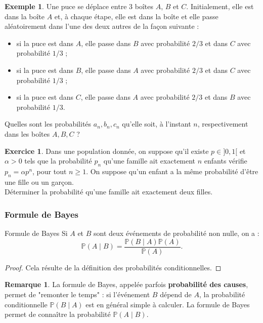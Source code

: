 \documentclass[french]{article}
\renewcommand{\P}{\mathbb{P}}
\theoremstyle{plain}
\theoremstyle{definition}
\newtheorem*{ex}{Exemple}
\newtheorem{exo}{Exercice}
\newtheorem*{rmq}{Remarque}
\theoremstyle{remark}
\begin{document}
\begin{ex}
	Une puce se déplace entre $3$ boîtes $A$, $B$ et $C$. Initialement, elle est dans la boîte $A$ et, à chaque étape, elle est dans la boîte et elle passe aléatoirement dans l'une des deux autres de la façon suivante :
	\begin{itemize}
		\item si la puce est dans $A$, elle passe dans $B$ avec probabilité $2/3$ et dans $C$ avec probabilité $1/3$ ;
		\item si la puce est dans $B$, elle passe dans $A$ avec probabilité $2/3$ et dans $C$ avec probabilité $1/3$ ;
		\item si la puce est dans $C$, elle passe dans $A$ avec probabilité $2/3$ et dans $B$ avec probabilité $1/3$.
	\end{itemize}
	Quelles sont les probabilités $a_n,b_n,c_n$ qu'elle soit, à l'instant $n$, respectivement dans les boîtes $A,B,C$ ?
\end{ex}

\begin{exo}
	Dans une population donnée, on suppose qu'il existe $p\in]0,1[$ et $\alpha>0$ tels que la probabilité $p_n$ qu'une famille ait exactement $n$ enfants vérifie $p_n=\alpha p^n$, pour tout $n\geqslant 1$. On suppose qu'un enfant a la même probabilité d'être une fille ou un garçon.\\
	Déterminer la probabilité qu'une famille ait exactement deux filles.
\end{exo}

\subsubsection*{Formule de Bayes}

\begin{thm}{Formule de Bayes}%
	Si $A$ et $B$ sont deux événements de probabilité non nulle, on a :
	$$\P(A\mid B)=\frac{\P(B\mid A)\P(A)}{\P(A)}.$$
\end{thm}
\begin{proof}
	Cela résulte de la définition des probabilités conditionnelles.
\end{proof}

\begin{rmq}
	La formule de Bayes, appelée parfois \textbf{probabilité des causes}, permet de "remonter le temps" : si l'événement $B$ dépend de $A$, la probabilité conditionnelle $\P(B\mid A)$ est en général simple à calculer. La formule de Bayes permet de connaître la probabilité $\P(A\mid B)$.
\end{rmq}
\end{document}
